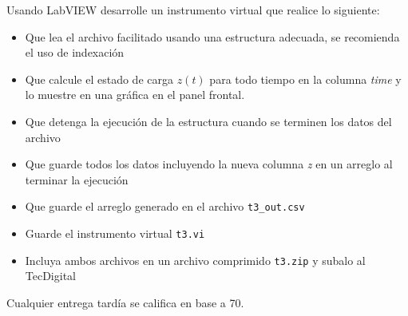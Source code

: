 \documentclass[12pt]{article}
\begin{document}
Usando LabVIEW desarrolle un instrumento virtual que realice lo siguiente:

\begin{itemize}
    \item Que lea el archivo facilitado usando una estructura adecuada, se recomienda el uso de indexación
    \item Que calcule el estado de carga $z(t)$ para todo tiempo en la columna \emph{time} y lo muestre en una gráfica en el panel frontal. 
    \item Que detenga la ejecución de la estructura cuando se terminen los datos del archivo
    \item Que guarde todos los datos incluyendo la nueva columna \emph{z} en un arreglo al terminar la ejecución
    \item Que guarde el arreglo generado en el archivo \verb+t3_out.csv+
    \item Guarde el instrumento virtual \verb+t3.vi+
    \item Incluya ambos archivos en un archivo comprimido \verb+t3.zip+ y subalo al TecDigital
\end{itemize}

Cualquier entrega tardía se califica en base a 70. 


% 
% 
\end{document}
